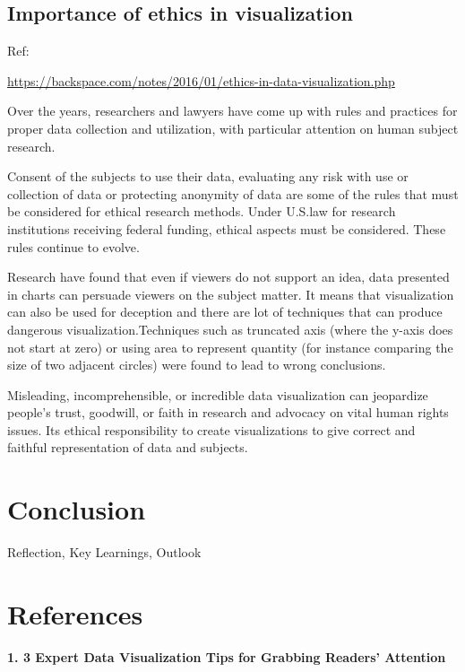 \documentclass[]{book}
\theoremstyle{definition}
\theoremstyle{definition}
\theoremstyle{definition}
\theoremstyle{remark}
\begin{document}
\section{Importance of ethics in
visualization}\label{importance-of-ethics-in-visualization}

Ref:

\url{https://backspace.com/notes/2016/01/ethics-in-data-visualization.php}

Over the years, researchers and lawyers have come up with rules and
practices for proper data collection and utilization, with particular
attention on human subject research.

Consent of the subjects to use their data, evaluating any risk with use
or collection of data or protecting anonymity of data are some of the
rules that must be considered for ethical research methods. Under
U.S.law for research institutions receiving federal funding, ethical
aspects must be considered. These rules continue to evolve.

Research have found that even if viewers do not support an idea, data
presented in charts can persuade viewers on the subject matter. It means
that visualization can also be used for deception and there are lot of
techniques that can produce dangerous visualization.Techniques such as
truncated axis (where the y-axis does not start at zero) or using area
to represent quantity (for instance comparing the size of two adjacent
circles) were found to lead to wrong conclusions.

Misleading, incomprehensible, or incredible data visualization can
jeopardize people's trust, goodwill, or faith in research and advocacy
on vital human rights issues. Its ethical responsibility to create
visualizations to give correct and faithful representation of data and
subjects.

\chapter{Conclusion}\label{conclusion}

Reflection, Key Learnings, Outlook

\chapter*{References}\label{references-1}

\textbf{1. 3 Expert Data Visualization Tips for Grabbing Readers'
Attention}
\end{document}
